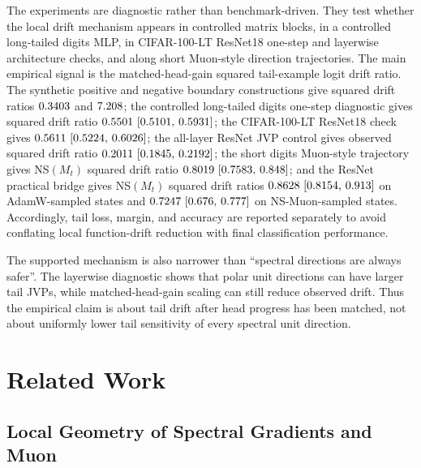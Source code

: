 \documentclass{article}
\theoremstyle{definition}
\begin{document}
The experiments are diagnostic rather than benchmark-driven. They test whether the local drift mechanism appears in controlled matrix blocks, in a controlled long-tailed digits MLP, in CIFAR-100-LT ResNet18 one-step and layerwise architecture checks, and along short Muon-style direction trajectories. The main empirical signal is the matched-head-gain squared tail-example logit drift ratio. The synthetic positive and negative boundary constructions give squared drift ratios \(0.3403\) and \(7.208\); the controlled long-tailed digits one-step diagnostic gives squared drift ratio \(0.5501 ~\text{[0.5101,\hspace{0.35em}0.5931]}\); the CIFAR-100-LT ResNet18 check gives \(0.5611 ~\text{[0.5224,\hspace{0.35em}0.6026]}\); the all-layer ResNet JVP control gives observed squared drift ratio \(0.2011 ~\text{[0.1845,\hspace{0.35em}0.2192]}\); the short digits Muon-style trajectory gives NS\((M_t)\) squared drift ratio \(0.8019 ~\text{[0.7583,\hspace{0.35em}0.848]}\); and the ResNet practical bridge gives NS\((M_t)\) squared drift ratios \(0.8628 ~\text{[0.8154,\hspace{0.35em}0.913]}\) on AdamW-sampled states and \(0.7247 ~\text{[0.676,\hspace{0.35em}0.777]}\) on NS-Muon-sampled states. Accordingly, tail loss, margin, and accuracy are reported separately to avoid conflating local function-drift reduction with final classification performance.

The supported mechanism is also narrower than ``spectral directions are always safer''. The layerwise diagnostic shows that polar unit directions can have larger tail JVPs, while matched-head-gain scaling can still reduce observed drift. Thus the empirical claim is about tail drift after head progress has been matched, not about uniformly lower tail sensitivity of every spectral unit direction.

\section{Related Work}

\subsection{Local Geometry of Spectral Gradients and Muon}
\end{document}
